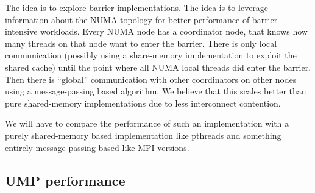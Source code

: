 \documentclass{article}
\begin{document}
The idea is to explore barrier implementations. The idea is to
leverage information about the NUMA topology for better performance of
barrier intensive workloads. Every NUMA node has a coordinator node,
that knows how many threads on that node want to enter the
barrier. There is only local communication (possibly using a
share-memory implementation to exploit the shared cache) until the
point where all NUMA local threads did enter the barrier.  Then there
is ``global'' communication with other coordinators on other nodes
using a message-passing based algorithm. We believe that this scales
better than pure shared-memory implementations due to less
interconnect contention.

We will have to compare the performance of such an implementation with
a purely shared-memory based implementation like pthreads and
something entirely message-passing based like MPI versions.

\newpage



\label{LastPage}


\begin{appendices}

\section{UMP performance}



\newpage





%

\end{appendices}
\end{document}
